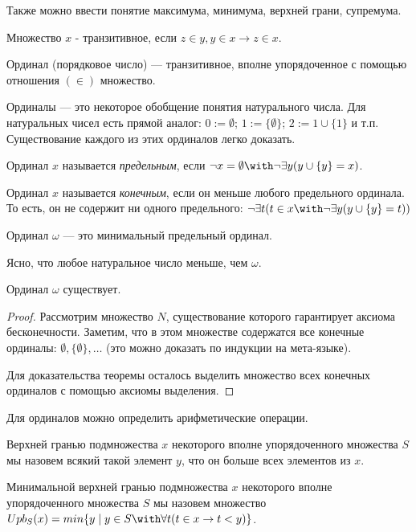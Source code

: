 Также можно ввести понятие максимума, минимума, верхней грани, супремума.

\begin{definition}
Множество $x$ - транзитивное, если $z \in y, y \in x \rightarrow z \in x$.
\end{definition}

\begin{definition}
Ординал (порядковое число) --- транзитивное, вполне упорядоченное с 
помощью отношения $(\in)$ множество.
\end{definition}

Ординалы --- это некоторое обобщение понятия натурального числа.
Для натуральных чисел есть прямой аналог:
$0 := \emptyset$; $1 := \{\emptyset\}$; $2 := 1 \cup \{1\}$ и т.п.
Существование каждого из этих ординалов легко доказать.

\begin{definition}Ординал $x$ называется \emph{предельным}, если 
$\neg x = \emptyset \with \neg \exists y (y \cup \{y\} = x)$.
\end{definition}

\begin{definition}Ординал $x$ называется \emph{конечным}, если
он меньше любого предельного ординала. То есть, он не содержит
ни одного предельного:
$\neg\exists t (t \in x \with \neg \exists y (y \cup \{y\} = t))$
\end{definition}

\begin{definition}Ординал $\omega$ --- это минимальный
предельный ординал.
\end{definition}

Ясно, что любое натуральное число меньше, чем $\omega$. 

\begin{theorem}Ординал $\omega$ существует.
\end{theorem}
\begin{proof}
Рассмотрим множество $N$, существование которого гарантирует аксиома 
бесконечности. Заметим, что в этом множестве содержатся все конечные ординалы: 
$\emptyset, \{\emptyset\}, \dots$ (это можно доказать по индукции на
мета-языке).

Для доказательства теоремы осталось выделить множество всех конечных ординалов 
с помощью аксиомы выделения.
\end{proof}

Для ординалов можно определить арифметические операции.

\begin{definition}
Верхней гранью подмножества $x$ некоторого вполне упорядоченного
множества $S$ мы назовем всякий такой элемент $y$, что он больше
всех элементов из $x$.

Минимальной верхней гранью подмножества $x$ некоторого вполне упорядоченного
множества $S$ мы назовем множество 
$Upb_S(x) = min \{y \mid y \in S \with \forall t (t \in x \rightarrow t < y)\}$.
\end{definition}


